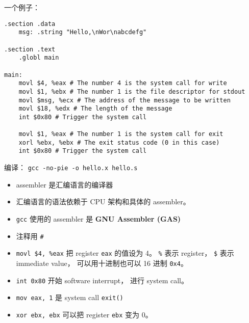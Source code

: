
\begin{issues}
\issueDraft
\end{issues}

一个例子：
\begin{lstlisting}[language=none]
.section .data
    msg: .string "Hello,\nWor\nabcdefg"

.section .text
    .globl main

main:
    movl $4, %eax # The number 4 is the system call for write
    movl $1, %ebx # The number 1 is the file descriptor for stdout
    movl $msg, %ecx # The address of the message to be written
    movl $18, %edx # The length of the message
    int $0x80 # Trigger the system call

    movl $1, %eax # The number 1 is the system call for exit
    xorl %ebx, %ebx # The exit status code (0 in this case)
    int $0x80 # Trigger the system call
\end{lstlisting}

编译： \verb|gcc -no-pie -o hello.x hello.s|

\begin{itemize}
\item assembler 是汇编语言的编译器
\item 汇编语言的语法依赖于 CPU 架构和具体的 assembler。
\item \verb|gcc| 使用的 assembler 是 \textbf{GNU Assembler (GAS)}
\item 注释用 \verb|#|
\item \verb|movl $4, %eax| 把 register \verb|eax| 的值设为 4。 \verb|%| 表示 register， \verb|$| 表示 immediate value， 可以用十进制也可以 16 进制 \verb|0x4|。
\item \verb|int 0x80| 开始 software interrupt， 进行 system call。
\item \verb|mov eax, 1| 是 system call \verb|exit()|
\item \verb|xor ebx, ebx| 可以把 register \verb|ebx| 变为 0。
\end{itemize}
